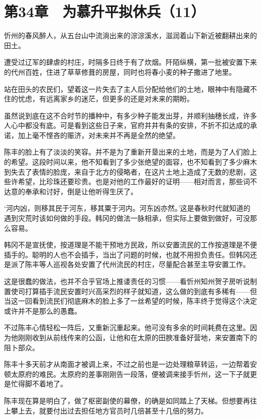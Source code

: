 \section{第34章　为慕升平拟休兵（11）}

忻州的春风醉人，从五台山中流淌出来的淙淙溪水，滋润着山下新近被翻耕出来的田土。

遭受过辽军的肆虐的村庄，时隔多日终于有了炊烟。阡陌纵横，第一批被安置下来的代州百姓，住进了草草修葺的房屋，同时也将春小麦的种子撒进了地里。

站在田头的农民们，望着这一片失去了主人后分配给他们的土地，眼神中有隐藏不住的忧虑，有远离家乡的迷茫，但更多的还是对未来的期盼。

虽然说到底在这不合时节的播种中，有多少种子能发出芽，并顺利抽穗长成，许多人心中都没有底。可是看到这些日子来，官府井井有条的安排，不折不扣达成的承诺，加上毫不悭吝的赈济，对未来并不再是全然的绝望。

陈丰的脸上有了淡淡的笑容。并不是为了重新开垦出来的土地，而是为了人们脸上的希望。这段时间以来，他不知看到了多少张绝望的面容，也不知看到了多少麻木到失去了表情的脸庞，来自于北方的侵略者，在这片土地上造成了无数的悲剧，这些许希望，比珍珠还要珍贵。也是对他的工作最好的证明——相对而言，那些词不达意的奉承和讨好，倒是让他听得生厌了。

‘河内凶，则移其民于河东，移其粟于河内。河东凶亦然。’这是春秋时代就知道的遇到灾荒时该如何做的手段。韩冈的做法一脉相承，但实际上要做到做好，可没那么容易。

韩冈不是宣抚使，按道理是不能干预地方民政，所以安置流民的工作按道理是不便插手的。聪明的人也不会插手，当出了问题的时候，也就不用担负责任。但韩冈还是派了陈丰等人巡视各处安置了代州流民的村庄，尽量配合甚至主导安置工作。

这是很蠢的做法，也并不合乎官场上推诿责任的习惯——看忻州知州贺子房听说制置使司打算插手流民安置时兴高采烈的样子就知道，这么做的到底有多稀有——但当这一回看到流民们彻底麻木的脸上多了一丝希望的时候，陈丰终于觉得这个决定或许并不是那么的愚蠢。

不过陈丰心情轻松一阵后，又重新沉重起来。他可没有多余的时间耗费在这里。因为他刚刚收到从前线传来的公函，让他和在太原的田腴准备好营地，来安置南下的阻卜部众。

陈丰十多天前才从南面才被调上来，不过之前也是一边处理粮草转运，一边帮着安顿太原府的难民。太原府的差事刚刚告一段落，便被调来接手忻州，这一下子就更是忙得脚不着地了。

陈丰现在算是明白了，做了枢密副使的幕僚，的确是如同踏上了天梯。但想要再往上攀上去，就要付出过去担任地方官员时几倍甚至十几倍的努力。


